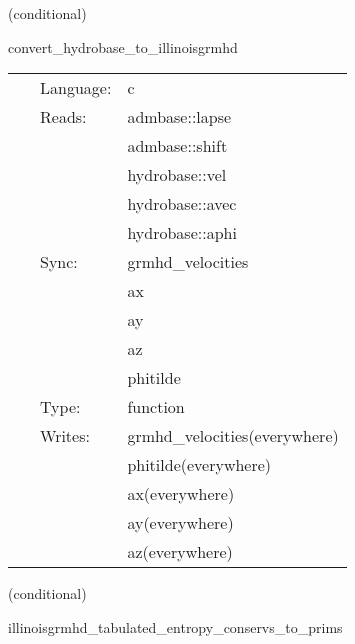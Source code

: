 \documentclass{article}
\begin{document}
   (conditional) 

\hspace{5mm} convert\_hydrobase\_to\_illinoisgrmhd 

\hspace{5mm}{\it convert hydrobase initial data (id) to illinoisgrmhd variables } 


\hspace{5mm}

 \begin{tabular*}{160mm}{cll} 
~ & Language:  & c \\ 
~ & Reads:  & admbase::lapse \\ 
~& ~ &admbase::shift\\ 
~& ~ &hydrobase::vel\\ 
~& ~ &hydrobase::avec\\ 
~& ~ &hydrobase::aphi\\ 
~ & Sync:  & grmhd\_velocities \\ 
~& ~ &ax\\ 
~& ~ &ay\\ 
~& ~ &az\\ 
~& ~ &phitilde\\ 
~ & Type:  & function \\ 
~ & Writes:  & grmhd\_velocities(everywhere) \\ 
~& ~ &phitilde(everywhere)\\ 
~& ~ &ax(everywhere)\\ 
~& ~ &ay(everywhere)\\ 
~& ~ &az(everywhere)\\ 
\end{tabular*} 


\vspace{5mm}

   (conditional) 

\hspace{5mm} illinoisgrmhd\_tabulated\_entropy\_conservs\_to\_prims 

\hspace{5mm}{\it entropy+tabulated version of illinoisgrmhd\_conservs\_to\_prims } 


\hspace{5mm}
\end{document}
